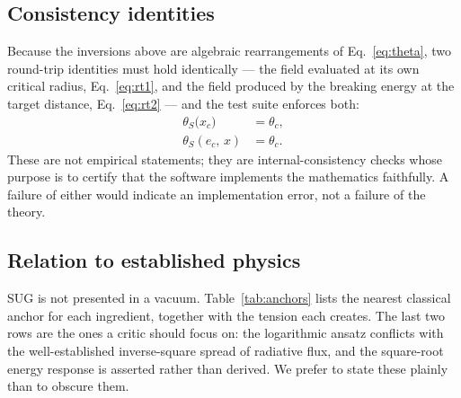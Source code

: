 \documentclass[11pt,a4paper]{article}
\newcommand{\thetaS}{\theta_{S}}
\begin{document}
\subsection{Consistency identities}
\label{sec:consistency}

Because the inversions above are algebraic rearrangements of
Eq.~\eqref{eq:theta}, two round-trip identities must hold identically --- the
field evaluated at its own critical radius, Eq.~\eqref{eq:rt1}, and the field
produced by the breaking energy at the target distance,
Eq.~\eqref{eq:rt2} --- and the test suite enforces both:
\begin{align}
  \thetaS\!\bigl(x_c\bigr) &= \theta_c ,
  \label{eq:rt1}\\
  \thetaS(e_c,\,x) &= \theta_c .
  \label{eq:rt2}
\end{align}
These are not empirical statements; they are internal-consistency checks
whose purpose is to certify that the software implements the mathematics
faithfully. A failure of either would indicate an implementation error, not a
failure of the theory.

\subsection{Relation to established physics}
\label{sec:context}

SUG is not presented in a vacuum. Table~\ref{tab:anchors} lists the nearest
classical anchor for each ingredient, together with the tension each
creates. The last two rows are the ones a critic should focus on: the
logarithmic ansatz conflicts with the well-established inverse-square spread of
radiative flux, and the square-root energy response is asserted rather than
derived. We prefer to state these plainly than to obscure them.
\end{document}
